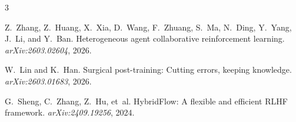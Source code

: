 \documentclass[11pt]{article}
\begin{document}

\begin{thebibliography}{3}

Z.~Zhang, Z.~Huang, X.~Xia, D.~Wang, F.~Zhuang, S.~Ma, N.~Ding, Y.~Yang, J.~Li, and Y.~Ban.
\newblock Heterogeneous agent collaborative reinforcement learning.
\newblock \emph{arXiv:2603.02604}, 2026.

W.~Lin and K.~Han.
\newblock Surgical post-training: Cutting errors, keeping knowledge.
\newblock \emph{arXiv:2603.01683}, 2026.

G.~Sheng, C.~Zhang, Z.~Hu, et~al.
\newblock HybridFlow: A flexible and efficient RLHF framework.
\newblock \emph{arXiv:2409.19256}, 2024.

\end{thebibliography}
\end{document}

